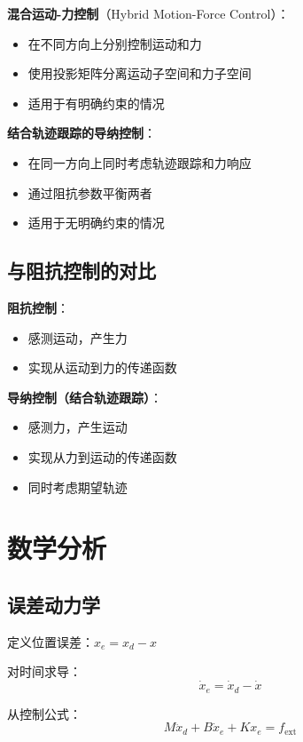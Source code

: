 \documentclass[12pt,a4paper]{article}
\begin{document}
\textbf{混合运动-力控制}（Hybrid Motion-Force Control）：
\begin{itemize}
\item 在不同方向上分别控制运动和力
\item 使用投影矩阵分离运动子空间和力子空间
\item 适用于有明确约束的情况
\end{itemize}

\textbf{结合轨迹跟踪的导纳控制}：
\begin{itemize}
\item 在同一方向上同时考虑轨迹跟踪和力响应
\item 通过阻抗参数平衡两者
\item 适用于无明确约束的情况
\end{itemize}

\subsection{与阻抗控制的对比}

\textbf{阻抗控制}：
\begin{itemize}
\item 感测运动，产生力
\item 实现从运动到力的传递函数
\end{itemize}

\textbf{导纳控制（结合轨迹跟踪）}：
\begin{itemize}
\item 感测力，产生运动
\item 实现从力到运动的传递函数
\item 同时考虑期望轨迹
\end{itemize}

\section{数学分析}

\subsection{误差动力学}

定义位置误差：$x_e = x_d - x$

对时间求导：
\begin{equation}
\dot{x}_e = \dot{x}_d - \dot{x}
\end{equation}

从控制公式：
\begin{equation}
M\ddot{x}_d + B\dot{x}_e + Kx_e = f_{\text{ext}}
\end{equation}
\end{document}
